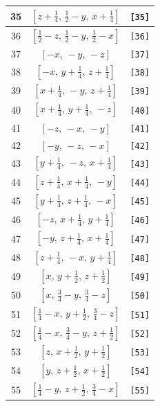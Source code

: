 \documentclass[fleqn,8pt]{jsarticle}
\begin{document}
\begin{longtable}{ccc}
35 & $\left[ z + \frac{1}{4},\, \frac{1}{2} - y,\, x + \frac{1}{4} \right]$ & {\tt [35]} \\ \hline
36 & $\left[ \frac{1}{2} - z,\, \frac{1}{2} - y,\, \frac{1}{2} - x \right]$ & {\tt [36]} \\ \hline
37 & $\left[ - x,\, - y,\, - z \right]$ & {\tt [37]} \\ \hline
38 & $\left[ - x,\, y + \frac{1}{4},\, z + \frac{1}{4} \right]$ & {\tt [38]} \\ \hline
39 & $\left[ x + \frac{1}{4},\, - y,\, z + \frac{1}{4} \right]$ & {\tt [39]} \\ \hline
40 & $\left[ x + \frac{1}{4},\, y + \frac{1}{4},\, - z \right]$ & {\tt [40]} \\ \hline
41 & $\left[ - z,\, - x,\, - y \right]$ & {\tt [41]} \\ \hline
42 & $\left[ - y,\, - z,\, - x \right]$ & {\tt [42]} \\ \hline
43 & $\left[ y + \frac{1}{4},\, - z,\, x + \frac{1}{4} \right]$ & {\tt [43]} \\ \hline
44 & $\left[ z + \frac{1}{4},\, x + \frac{1}{4},\, - y \right]$ & {\tt [44]} \\ \hline
45 & $\left[ y + \frac{1}{4},\, z + \frac{1}{4},\, - x \right]$ & {\tt [45]} \\ \hline
46 & $\left[ - z,\, x + \frac{1}{4},\, y + \frac{1}{4} \right]$ & {\tt [46]} \\ \hline
47 & $\left[ - y,\, z + \frac{1}{4},\, x + \frac{1}{4} \right]$ & {\tt [47]} \\ \hline
48 & $\left[ z + \frac{1}{4},\, - x,\, y + \frac{1}{4} \right]$ & {\tt [48]} \\ \hline
49 & $\left[ x,\, y + \frac{1}{2},\, z + \frac{1}{2} \right]$ & {\tt [49]} \\ \hline
50 & $\left[ x,\, \frac{3}{4} - y,\, \frac{3}{4} - z \right]$ & {\tt [50]} \\ \hline
51 & $\left[ \frac{1}{4} - x,\, y + \frac{1}{2},\, \frac{3}{4} - z \right]$ & {\tt [51]} \\ \hline
52 & $\left[ \frac{1}{4} - x,\, \frac{3}{4} - y,\, z + \frac{1}{2} \right]$ & {\tt [52]} \\ \hline
53 & $\left[ z,\, x + \frac{1}{2},\, y + \frac{1}{2} \right]$ & {\tt [53]} \\ \hline
54 & $\left[ y,\, z + \frac{1}{2},\, x + \frac{1}{2} \right]$ & {\tt [54]} \\ \hline
55 & $\left[ \frac{1}{4} - y,\, z + \frac{1}{2},\, \frac{3}{4} - x \right]$ & {\tt [55]} \\ \hline

\end{longtable}
\end{document}
